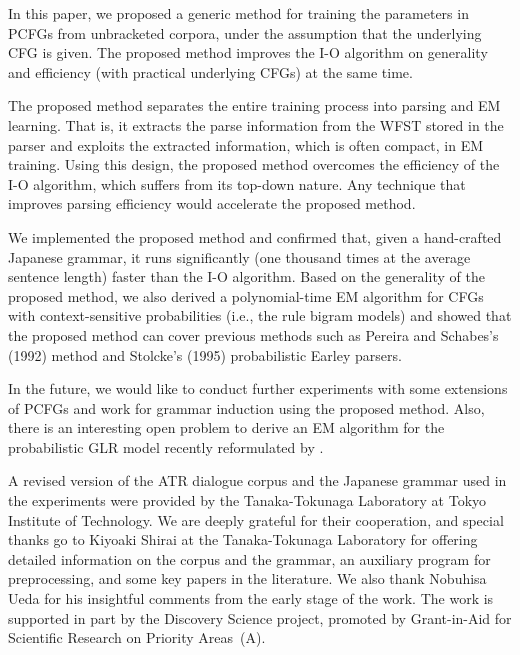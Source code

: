 \documentclass[english]{jnlp_1.4_rep}
\begin{document}
In this paper, we proposed a generic method for training the
parameters in PCFGs from unbracketed corpora, under the assumption
that the underlying CFG is given.  The proposed method improves
the I-O algorithm on generality and efficiency
(with practical underlying CFGs) at the same time.

The proposed method separates the entire training process
into parsing and EM learning.  That is, it extracts
the parse information from the WFST stored in the parser
and exploits the extracted information, which is often compact,
in EM training.  Using this design, the proposed method overcomes
the efficiency of the I-O algorithm, which suffers
from its top-down nature.  Any technique that improves
parsing efficiency would accelerate the proposed method.

We implemented the proposed method and confirmed that,
given a hand-crafted Japanese grammar, it runs
significantly (one thousand times at the average sentence length)
faster than the I-O algorithm.  Based on the generality of
the proposed method, we also derived a polynomial-time EM
algorithm for CFGs with context-sensitive probabilities
(i.e., the rule bigram models) and showed that the proposed method
can cover previous methods such as Pereira and Schabes's (1992) method
and Stolcke's (1995) probabilistic Earley parsers.

In the future, we would like to conduct further experiments with
some extensions of PCFGs and work for grammar induction
using the proposed method.  Also, there is an interesting open
problem to derive an EM algorithm for the probabilistic
GLR model recently reformulated by .


\acknowledgment

A revised version of the ATR dialogue corpus and the Japanese grammar
used in the experiments were provided by the Tanaka-Tokunaga Laboratory
at Tokyo Institute of Technology.  We are deeply grateful for their
cooperation, and special thanks go to Kiyoaki Shirai
at the Tanaka-Tokunaga Laboratory for offering detailed information
on the corpus and the grammar, an auxiliary program for preprocessing,
and some key papers in the literature.
We also thank Nobuhisa Ueda for his insightful
comments from the early stage of the work.  The work is supported
in part by the Discovery Science project, promoted by Grant-in-Aid
for Scientific Research on Priority Areas~(A).
\end{document}
